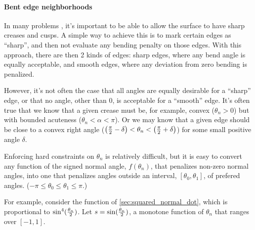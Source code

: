
\paragraph{Bent edge neighborhoods}
\label{sec:Bent-edge-neighborhoods}

In many problems \cite{hoppe-et-al-94,hoppe-thesis-94},
it's important to be able to allow the surface to have
sharp creases and cusps.
A simple way to achieve this is to mark
certain edges as ``sharp'',
and then not evaluate any bending penalty
on those edges.
With this approach, there are then 2 kinds of edges:
sharp edges, where any bend angle is equally acceptable,
and smooth edges, 
where any deviation from zero bending is penalized.

However, it's not often the case that all angles
are equally desirable for a ``sharp'' edge,
or that no angle, other than $0$, is acceptable
for a ``smooth'' edge.
It's often true that we know that a given crease
must be, for example, convex ($\theta_n > 0$)
but with bounded acuteness ($\theta_n < \alpha < \pi$).
Or we may know that a given edge should be close to
a convex right angle 
($\left( {\pi \over 2} - \delta \right) 
< \theta_n < 
\left( {\pi \over 2} + \delta \right)$)
for some small positive angle $\delta$.

Enforcing hard constraints on $\theta_n$
is relatively difficult,
but it is easy to convert any function
of the signed normal angle, $f(\theta_n)$,
that penalizes non-zero normal angles,
into one that penalizes angles 
outside an interval, $\left[\theta_0,\theta_1\right]$,
of prefered angles.
($-\pi \leq \theta_0 \leq \theta_1 \leq \pi$.)

For example,
consider the function of \autoref{sec:squared_normal_dot},
which is proportional to $\sin^4({\theta_n \over 2})$. 
Let $s = \sin({\theta_n \over 2})$,
a monotone function of $\theta_n$ 
that ranges over $\left[ -1, 1 \right]$.

